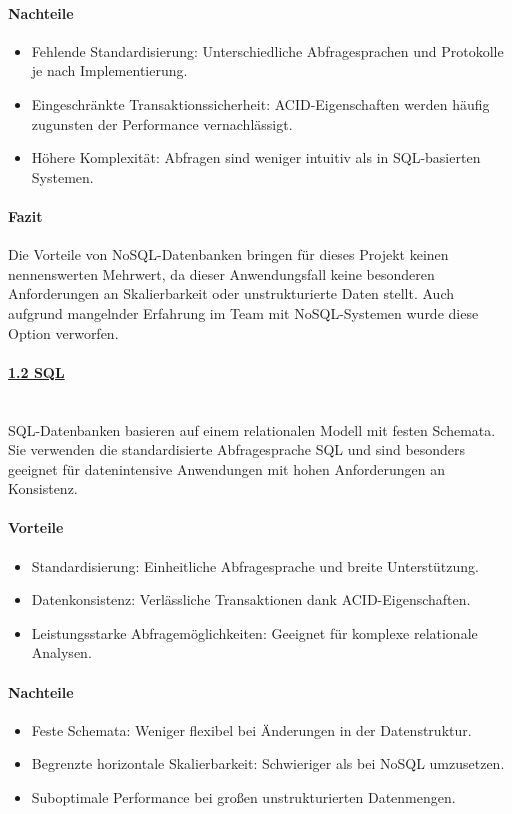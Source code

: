 \documentclass[a4paper,12pt]{report}
\begin{document}
    \paragraph*{Nachteile}
    \begin{itemize}
        \item Fehlende Standardisierung: Unterschiedliche Abfragesprachen und Protokolle je nach Implementierung.
        \item Eingeschränkte Transaktionssicherheit: ACID-Eigenschaften werden häufig zugunsten der Performance vernachlässigt.
        \item Höhere Komplexität: Abfragen sind weniger intuitiv als in SQL-basierten Systemen.
    \end{itemize}

    \paragraph*{Fazit}
    Die Vorteile von NoSQL-Datenbanken bringen für dieses Projekt keinen nennenswerten Mehrwert, da dieser Anwendungsfall keine besonderen Anforderungen an Skalierbarkeit oder unstrukturierte Daten stellt.
    Auch aufgrund mangelnder Erfahrung im Team mit NoSQL-Systemen wurde diese Option verworfen.

    \paragraph*{\underline{1.2 SQL}}\mbox{}\\
    SQL-Datenbanken basieren auf einem relationalen Modell mit festen Schemata.
    Sie verwenden die standardisierte Abfragesprache SQL und sind besonders geeignet für datenintensive Anwendungen mit hohen Anforderungen an Konsistenz.

    \paragraph*{Vorteile}
    \begin{itemize}
        \item Standardisierung: Einheitliche Abfragesprache und breite Unterstützung.
        \item Datenkonsistenz: Verlässliche Transaktionen dank ACID-Eigenschaften.
        \item Leistungsstarke Abfragemöglichkeiten: Geeignet für komplexe relationale Analysen.
    \end{itemize}

    \paragraph*{Nachteile}
    \begin{itemize}
        \item Feste Schemata: Weniger flexibel bei Änderungen in der Datenstruktur.
        \item Begrenzte horizontale Skalierbarkeit: Schwieriger als bei NoSQL umzusetzen.
        \item Suboptimale Performance bei großen unstrukturierten Datenmengen.
    \end{itemize}
\end{document}
